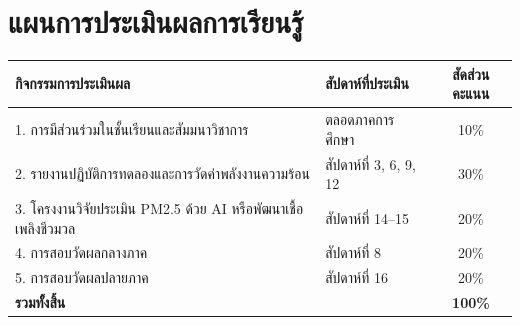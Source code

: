 \section*{แผนการประเมินผลการเรียนรู้}
\begin{table}[H]
\centering\small
\begin{tabularx}{\textwidth}{p{} p{} c}
\toprule
\textbf{กิจกรรมการประเมินผล} & \textbf{สัปดาห์ที่ประเมิน} & \textbf{สัดส่วนคะแนน} \\
\midrule
1. การมีส่วนร่วมในชั้นเรียนและสัมมนาวิชาการ & ตลอดภาคการศึกษา & 10\% \\
2. รายงานปฏิบัติการทดลองและการวัดค่าพลังงานความร้อน & สัปดาห์ที่ 3, 6, 9, 12 & 30\% \\
3. โครงงานวิจัยประเมิน PM2.5 ด้วย AI หรือพัฒนาเชื้อเพลิงชีวมวล & สัปดาห์ที่ 14--15 & 20\% \\
4. การสอบวัดผลกลางภาค & สัปดาห์ที่ 8 & 20\% \\
5. การสอบวัดผลปลายภาค & สัปดาห์ที่ 16 & 20\% \\
\midrule
\textbf{รวมทั้งสิ้น} & & \textbf{100\%} \\
\bottomrule
\end{tabularx}
\end{table}
